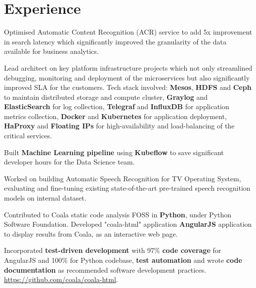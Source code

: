 \documentclass[]{deedy-resume-openfont}
\begin{document}
\begin{minipage}[t]{0.66\textwidth} 


\section{Experience}
\vspace{\topsep} %
\begin{tightemize}
\item Optimised Automatic Content Recognition (ACR) service to add 5x improvement in search latency which significantly improved the granularity of the data available for business analytics.
\item Lead architect on key platform infrastructure projects which not only streamlined debugging, monitoring and deployment of the microservices but also significantly improved SLA for the customers. Tech stack involved: \textbf{Mesos}, \textbf{HDFS} and \textbf{Ceph} to maintain distributed storage and compute cluster, \textbf{Graylog} and \textbf{ElasticSearch} for log collection, \textbf{Telegraf} and \textbf{InfluxDB} for application metrics collection, \textbf{Docker} and \textbf{Kubernetes} for application deployment, \textbf{HaProxy} and \textbf{Floating IPs} for high-availability and load-balancing of the critical services.
\item Built \textbf{Machine Learning pipeline} using \textbf{Kubeflow} to save significant developer hours for the Data Science team.
\item Worked on building Automatic Speech Recognition for TV Operating System, evaluating and fine-tuning existing state-of-the-art pre-trained speech recognition models on internal dataset.
\end{tightemize}
\sectionsep

\begin{tightemize}     
\item Contributed to Coala \textemdash static code analysis FOSS \textemdash in \textbf{Python}, under Python Software Foundation. Developed "coala-html" application \textemdash \textbf{AngularJS} application to display results from Coala, as an interactive web page.
\item Incorporated \textbf{test-driven development} with 97\%    \textbf{code coverage} for AngularJS and 100\% for Python codebase, \textbf{test automation} and wrote \textbf{code documentation} as recommended software development practices. \href{https://github.com/coala/coala-html}{https://github.com/coala/coala-html}.
\end{tightemize}
\sectionsep


\end{minipage}
\end{document}
